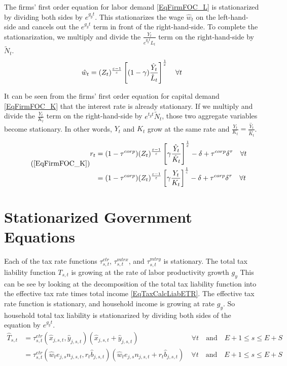   The firms' first order equation for labor demand \eqref{EqFirmFOC_L} is stationarized by dividing both sides by $e^{g_y t}$. This stationarizes the wage $\hat{w}_t$ on the left-hand-side and cancels out the $e^{g_y t}$ term in front of the right-hand-side. To complete the stationarization, we multiply and divide the $\frac{Y_t}{e^{g_y t}L_t}$ term on the right-hand-side by $\tilde{N}_t$.
  \begin{equation}\label{EqStnrzFOC_L}
    \hat{w}_t = (Z_t)^\frac{\varepsilon-1}{\varepsilon}\left[(1-\gamma)\frac{\hat{Y}_t}{\hat{L}_t}\right]^\frac{1}{\varepsilon} \quad\forall t
  \end{equation}

  It can be seen from the firms' first order equation for capital demand \eqref{EqFirmFOC_K} that the interest rate is already stationary. If we multiply and divide the $\frac{Y_t}{K_t}$ term on the right-hand-side by $e^{t_y t}\tilde{N}_t$, those two aggregate variables become stationary. In other words, $Y_t$ and $K_t$ grow at the same rate and $\frac{Y_t}{K_t} = \frac{\hat{Y}_t}{\hat{K}_t}$.
  \begin{equation}\tag{\ref{EqFirmFOC_K}}
    \begin{split}
      r_t &= (1 - \tau^{corp})(Z_t)^\frac{\ve-1}{\ve}\left[\gamma\frac{\hat{Y}_t}{\hat{K}_t}\right]^\frac{1}{\ve} - \delta + \tau^{corp}\delta^\tau \quad\forall t \\
      &= (1 - \tau^{corp})(Z_t)^\frac{\ve-1}{\ve}\left[\gamma\frac{Y_t}{K_t}\right]^\frac{1}{\ve} - \delta + \tau^{corp}\delta^\tau \quad\forall t
    \end{split}
  \end{equation}


\section{Stationarized Government Equations}\label{SecStnrzGovt}

  Each of the tax rate functions $\tau^{etr}_{s,t}$, $\tau^{mtrx}_{s,t}$, and $\tau^{mtry}_{s,t}$ is stationary. The total tax liability function $T_{s,t}$ is growing at the rate of labor productivity growth $g_y$ This can be see by looking at the decomposition of the total tax liability function into the effective tax rate times total income \eqref{EqTaxCalcLiabETR}. The effective tax rate function is stationary, and household income is growing at rate $g_y$. So household total tax liability is stationarized by dividing both sides of the equation by $e^{g_y t}$.
  \begin{equation}\label{EqStnrzLiabETR}
    \begin{split}
      \hat{T}_{s,t} &= \tau^{etr}_{s,t}(\hat{x}_{j,s,t}, \hat{y}_{j,s,t})\left(\hat{x}_{j,s,t} + \hat{y}_{j,s,t}\right) \qquad\qquad\qquad\quad\:\:\forall t \quad\text{and}\quad E+1\leq s\leq E+S \\
      &= \tau^{etr}_{s,t}(\hat{w}_t e_{j,s}n_{j,s,t}, r_t\hat{b}_{j,s,t})\left(\hat{w}_t e_{j,s}n_{j,s,t} + r_t\hat{b}_{j,s,t}\right) \quad\forall t \quad\text{and}\quad E+1\leq s\leq E+S
    \end{split}
  \end{equation}

